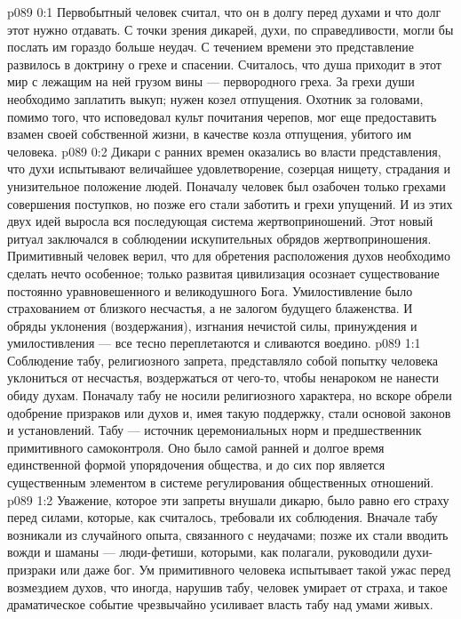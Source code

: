 \author{Блестящая Вечерняя Звезда}
\vs p089 0:1 Первобытный человек считал, что он в долгу перед духами и что долг этот нужно отдавать. С точки зрения дикарей, духи, по справедливости, могли бы послать им гораздо больше неудач. С течением времени это представление развилось в доктрину о грехе и спасении. Считалось, что душа приходит в этот мир с лежащим на ней грузом вины --- первородного греха. За грехи души необходимо заплатить выкуп; нужен козел отпущения. Охотник за головами, помимо того, что исповедовал культ почитания черепов, мог еще предоставить взамен своей собственной жизни, в качестве козла отпущения, убитого им человека.
\vs p089 0:2 Дикари с ранних времен оказались во власти представления, что духи испытывают величайшее удовлетворение, созерцая нищету, страдания и унизительное положение людей. Поначалу человек был озабочен только грехами совершения поступков, но позже его стали заботить и грехи упущений. И из этих двух идей выросла вся последующая система жертвоприношений. Этот новый ритуал заключался в соблюдении искупительных обрядов жертвоприношения. Примитивный человек верил, что для обретения расположения духов необходимо сделать нечто особенное; только развитая цивилизация осознает существование постоянно уравновешенного и великодушного Бога. Умилостивление было страхованием от близкого несчастья, а не залогом будущего блаженства. И обряды уклонения (воздержания), изгнания нечистой силы, принуждения и умилостивления --- все тесно переплетаются и сливаются воедино.
\vs p089 1:1 Соблюдение табу, религиозного запрета, представляло собой попытку человека уклониться от несчастья, воздержаться от чего\hyp{}то, чтобы ненароком не нанести обиду духам. Поначалу табу не носили религиозного характера, но вскоре обрели одобрение призраков или духов и, имея такую поддержку, стали основой законов и установлений. Табу --- источник церемониальных норм и предшественник примитивного самоконтроля. Оно было самой ранней и долгое время единственной формой упорядочения общества, и до сих пор является существенным элементом в системе регулирования общественных отношений.
\vs p089 1:2 Уважение, которое эти запреты внушали дикарю, было равно его страху перед силами, которые, как считалось, требовали их соблюдения. Вначале табу возникали из случайного опыта, связанного с неудачами; позже их стали вводить вожди и шаманы --- люди\hyp{}фетиши, которыми, как полагали, руководили духи\hyp{}призраки или даже бог. Ум примитивного человека испытывает такой ужас перед возмездием духов, что иногда, нарушив табу, человек умирает от страха, и такое драматическое событие чрезвычайно усиливает власть табу над умами живых.
